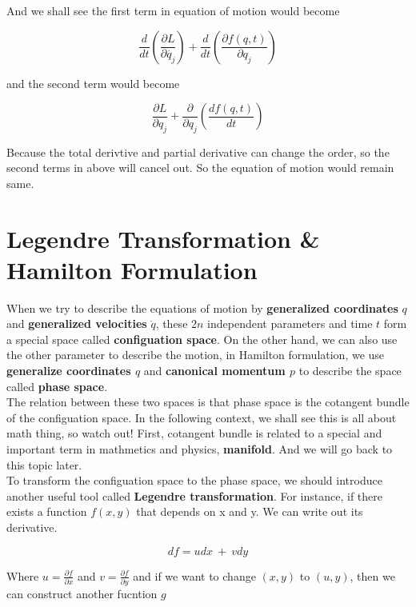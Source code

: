 \documentclass[12pt]{article}
\begin{document}
And we shall see the first term in equation of motion would become

\begin{center}
    \[ \frac{d}{dt} \left( \frac{ \partial{L} }{\partial{\dot{q_j}}} \right) + \frac{d}{dt} \left(\frac{ \partial{f(q, t)} }{ \partial{q_j} } \right) \]
\end{center}

and the second term would become

\begin{center}
    \[  \frac{ \partial{L} }{ \partial{q_j} } + \frac{ \partial }{ \partial{q_j} } \left( \frac{df(q,t)}{dt} \right) \]    
\end{center}

Because the total derivtive and partial derivative can change the order, so the second terms in above will cancel out. So the equation of motion would remain same.

\section{Legendre Transformation \& Hamilton Formulation}
When we try to describe the equations of motion by \textbf{generalized coordinates} $q$ and \textbf{generalized velocities} $\dot{q}$, these $2n$ independent parameters  and time $t$ form a special space called \textbf{configuation space}.
On the other hand, we can also use the other parameter to describe the motion, in Hamilton formulation, we use \textbf{generalize coordinates $q$} and \textbf{canonical momentum $p$} to describe the space called \textbf{phase space}.
\\
The relation between these two spaces is that phase space is the cotangent bundle of the configuation space. In the following context, we shall see this is all about math thing, so watch out!
First, cotangent bundle is related to a special and important term in mathmetics and physics, \textbf{manifold}. And we will go back to this topic later.
\\
To transform the configuation space to the phase space, we should introduce another useful tool called \textbf{Legendre transformation}.
For instance, if there exists a function $f(x,y)$ that depends on x and y. We can write out its derivative.

\begin{center}
    \[ df = udx\ +\ vdy\]
\end{center}

Where $u = \frac{\partial{f}}{\partial{x}}$ and $ v = \frac{\partial{f}}{\partial{y}}$
and if we want to change $(x, y)$ to $(u, y)$, then we can construct another fucntion $g$
\end{document}
